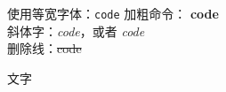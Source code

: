 \documentclass{ctexart}
\begin{document}
    使用等宽字体：\texttt{code} 
    加粗命令： \textbf{code} \\
    斜体字：\textit{code}，或者 \emph{code} \\
    删除线：\sout{code}


    \fontsize{5pt}{\baselineskip}\selectfont  文字
\end{document}
